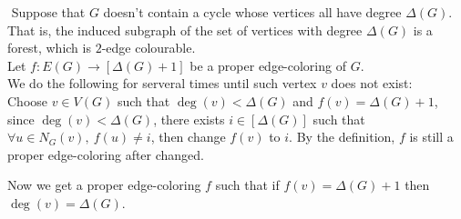 \setcounter{pr}{3}
\begin{pr}$ $
Suppose that $G$ doesn't contain a cycle whose vertices all have degree $\Delta(G)$.\\
That is, the induced subgraph of the set of vertices with degree $\Delta(G)$ is a forest, which is $2$-edge colourable.\\


Let $f:E(G)\to[\Delta(G)+1]$ be a proper edge-coloring of $G$.\\
We do the following for serveral times until such vertex $v$ does not exist:\\
Choose $v\in V(G)$ such that $\deg(v)<\Delta(G)$ and $f(v)=\Delta(G)+1$, since $\deg(v)<\Delta(G)$, there exists $i\in[\Delta(G)]$ such that $\forall u\in N_G(v),\ f(u)\neq i$, then change $f(v)$ to $i$. By the definition, $f$ is still a proper edge-coloring after changed.

Now we get a proper edge-coloring $f$ such that if $f(v)=\Delta(G)+1$ then $\deg(v)=\Delta(G)$.\\


\end{pr}
